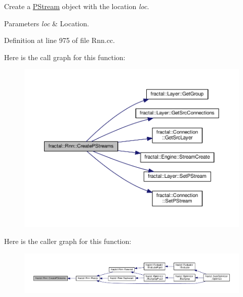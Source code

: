 Create a \hyperlink{classfractal_1_1PStream}{P\+Stream} object with the location {\itshape loc}. 


\begin{DoxyParams}{Parameters}
{\em loc} & Location. \\
\hline
\end{DoxyParams}


Definition at line 975 of file Rnn.\+cc.



Here is the call graph for this function\+:\nopagebreak
\begin{figure}[H]
\begin{center}
\leavevmode
\includegraphics[width=350pt]{de/dca/classfractal_1_1Rnn_adaf84bde48406ad0c51bfbba084c5516_cgraph}
\end{center}
\end{figure}




Here is the caller graph for this function\+:\nopagebreak
\begin{figure}[H]
\begin{center}
\leavevmode
\includegraphics[width=350pt]{de/dca/classfractal_1_1Rnn_adaf84bde48406ad0c51bfbba084c5516_icgraph}
\end{center}
\end{figure}


